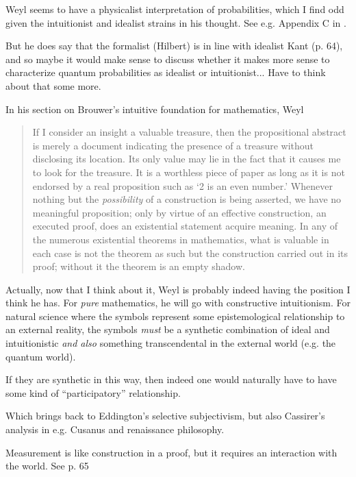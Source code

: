 Weyl seems to have a physicalist interpretation of probabilities, which I find odd given the intuitionist and idealist strains in his thought.  See e.g. Appendix C in \citep{Weyl1949}.

But he does say that the formalist (Hilbert) is in line with idealist Kant (p.  64), and so maybe it would make sense to  discuss whether it makes more sense to characterize quantum probabilities as idealist or intuitionist... Have to think about that some more.

In his section on Brouwer's intuitive foundation for mathematics, Weyl 

\begin{quote}
    If I consider an insight a valuable treasure, then the propositional abstract is merely a document indicating the presence of a treasure without disclosing its location.  Its only value may lie in the fact that it causes me to look for the treasure.  It is a worthless piece of paper as long as it is not endorsed by a real proposition such as `2 is an even number.'  Whenever nothing but the \emph{possibility} of a construction is being asserted, we have no meaningful proposition; only by virtue of an effective construction, an executed proof, does an existential statement acquire meaning.  In any of the numerous existential theorems in mathematics, what is valuable in each case is not the theorem as such but the construction carried out in its proof; without it the theorem is an empty shadow.

    \citep[p. 51]{Weyl1949}
\end{quote}

Actually, now that I think about it, Weyl is probably indeed having the position I think he has.  For \emph{pure} mathematics, he will go with constructive intuitionism.  For natural science where the symbols represent some epistemological relationship to an external reality, the symbols \emph{must} be a synthetic combination of ideal and intuitionistic \emph{and also} something transcendental in the external world (e.g. the quantum world).  

If they are synthetic in this way, then indeed one would naturally have to have some kind of ``participatory'' relationship.

Which brings back to Eddington's selective subjectivism, but also Cassirer's analysis in e.g. Cusanus and renaissance philosophy.  

Measurement is like construction in a proof, but it requires an interaction with the world. See p. 65 \citep[p. 65]{Weyl1949}

